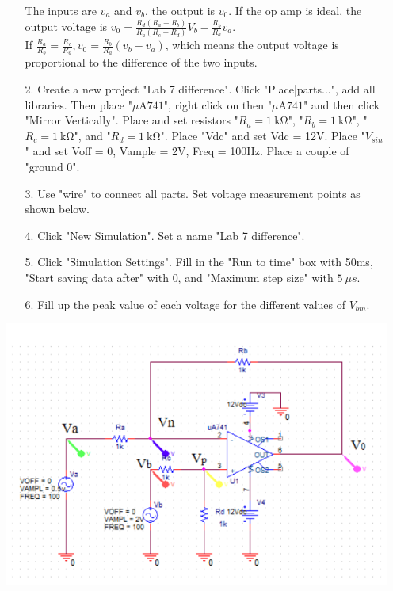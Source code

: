 \documentclass[a4paper]{article}
\begin{document}
\begin{itemize}
\begin{itemize}
	      	      The inputs are $v_{a}$ and $v_{b}$, the output is $v_{0}$. If the op amp is ideal, the output voltage is $v_{0} = \frac{R_{d}(R_{a} + R_{b})}{R_{a}(R_{c} + R_{d})}V_{b} - \frac{R_{b}}{R_{a}}v_{a}$. \\
	      	      If $\frac{R_{a}}{R_{b}} = \frac{R_{c}}{R_{d}}, v_{0} = \frac{R_{b}}{R_{a}}(v_{b} - v_{a})$, which means the output voltage is proportional to the difference of the two inputs.
	      	\item[2.] Create a new project "Lab 7 difference". Click "Place|parts...", add all libraries. Then place "$\si{\mu\ampere}741$", right click on then "$\si{\mu\ampere}741$" and then click  "Mirror Vertically". Place and set resistors "$R_{a} = \SI{1}{\kilo\ohm}$", "$R_{b} = \SI{1}{\kilo\ohm}$", "$R_{c} = \SI{1}{\kilo\ohm}$", and "$R_{d} = \SI{1}{\kilo\ohm}$". Place "Vdc" and set Vdc = 12V. Place "$V_{sin}$" and set Voff = 0, Vample = 2V, Freq = 100Hz. Place a couple of "ground 0".
	      	\item[3.] Use "wire" to connect all parts. Set voltage measurement points as shown below.
	      	\item[4.] Click "New Simulation". Set a name "Lab 7 difference".
	      	\item[5.] Click "Simulation Settings". Fill in the "Run to time" box with 50ms, "Start saving data after" with 0, and "Maximum step size" with $\SI{5}{\mu}s$.
	      	\item[6.] Fill up the peak value of each voltage for the different values of $V_{bm}$.   
	      \end{itemize} 
	      \includegraphics{circuit-6.png} \\
	      \begin{tabular}{|l|l|l|l|l|l|l|}

\end{tabular}
\end{itemize}
\end{document}
